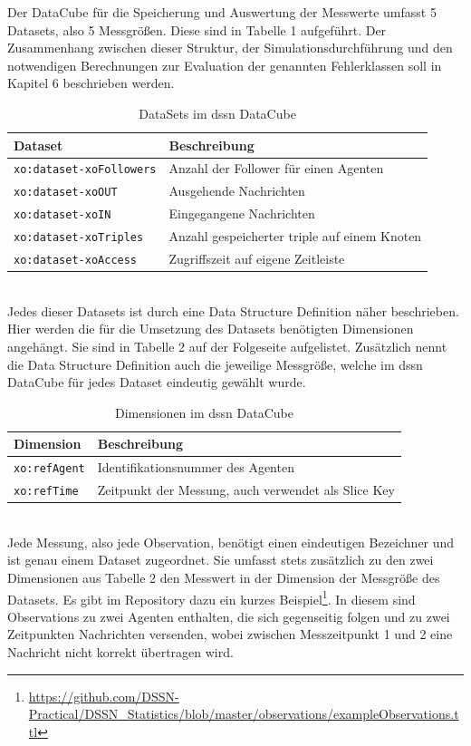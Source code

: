 \documentclass{article}
\begin{document}
Der DataCube für die Speicherung und Auswertung der Messwerte umfasst 5 Datasets, also 5 Messgrößen. Diese sind in Tabelle 1 aufgeführt. Der Zusammenhang zwischen dieser Struktur, der Simulationsdurchführung und den notwendigen Berechnungen zur Evaluation der genannten Fehlerklassen soll in Kapitel 6 beschrieben werden.\\
\begin{table}[ht]
\centering
\label{table1}
\begin{tabular}{|l|l|}
\hline
Dataset & Beschreibung \\ \hline
\texttt{xo:dataset-xoFollowers}       & Anzahl der Follower für einen Agenten            	\\ \hline
\texttt{xo:dataset-xoOUT}        & Ausgehende Nachrichten         \\ \hline
\texttt{xo:dataset-xoIN}        & Eingegangene Nachrichten             						\\ \hline
\texttt{xo:dataset-xoTriples}        & Anzahl gespeicherter triple auf einem Knoten        	\\ \hline
\texttt{xo:dataset-xoAccess}        & Zugriffszeit auf eigene Zeitleiste             		\\ \hline
\end{tabular}
\caption{DataSets im dssn DataCube}
\end{table}\\
Jedes dieser Datasets ist durch eine Data Structure Definition näher beschrieben. Hier werden die für die Umsetzung des Datasets benötigten Dimensionen angehängt. Sie sind in Tabelle 2 auf der Folgeseite aufgelistet. Zusätzlich nennt die Data Structure Definition auch die jeweilige Messgröße, welche im dssn DataCube für jedes Dataset eindeutig gewählt wurde.
\begin{table}[t]
\centering
\label{table2}
\begin{tabular}{|l|l|}
\hline
Dimension & Beschreibung \\ \hline
\texttt{xo:refAgent}       & Identifikationsnummer des Agenten            			\\ \hline
\texttt{xo:refTime}        & Zeitpunkt der Messung, auch verwendet als Slice Key	\\ \hline
\end{tabular}
\caption{Dimensionen im dssn DataCube}
\end{table}\\
Jede Messung, also jede Observation, benötigt einen eindeutigen Bezeichner und ist genau einem Dataset zugeordnet. Sie umfasst stets zusätzlich zu den zwei Dimensionen aus Tabelle 2 den Messwert in der Dimension der Messgröße des Datasets. Es gibt im Repository dazu ein kurzes Beispiel\footnote{\url{https://github.com/DSSN-Practical/DSSN_Statistics/blob/master/observations/exampleObservations.ttl}}. In diesem sind Observations zu zwei Agenten enthalten, die sich gegenseitig folgen und zu zwei Zeitpunkten Nachrichten versenden, wobei zwischen Messzeitpunkt 1 und 2 eine Nachricht nicht korrekt übertragen wird.
\end{document}

